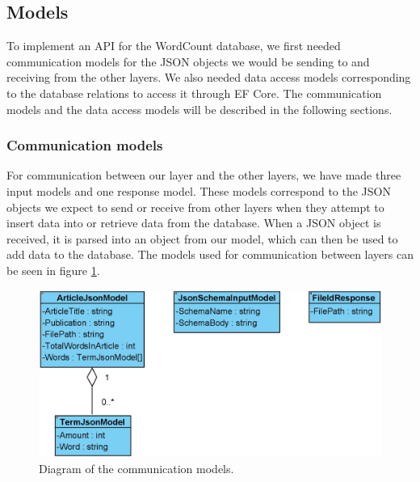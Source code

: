 \subsection{Models}\label{models}
To implement an API for the WordCount database, we first needed communication models for the JSON objects we would be sending to and receiving from the other layers. 
We also needed data access models corresponding to the database relations to access it through EF Core. 
The communication models and the data access models will be described in the following sections.

\subsubsection*{Communication models}
For communication between our layer and the other layers, we have made three input models and one response model. 
These models correspond to the JSON objects we expect to send or receive from other layers when they attempt to insert data into or retrieve data from the database. 
When a JSON object is received, it is parsed into an object from our model, which can then be used to add data to the database. The models used for communication between layers can be seen in figure \ref*{fig:CommunicationModels}.
\\
\begin{figure}[H]
    \centering
    \includegraphics[scale=0.4]{Images/CommunicationModels.jpg}
    \caption{Diagram of the communication models.}
    \label{fig:CommunicationModels}
\end{figure}

